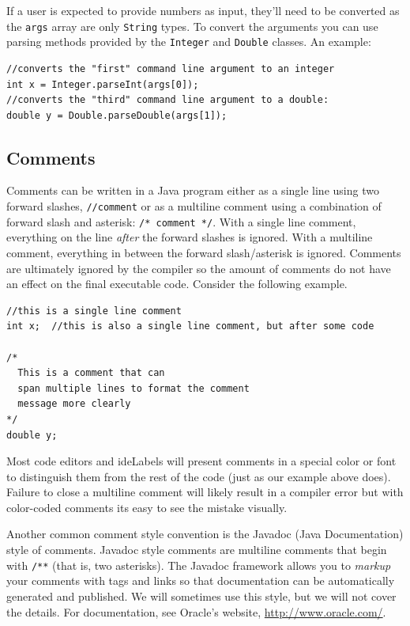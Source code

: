 If a user is expected to provide numbers as input, they'll need to
be converted as the \texttt{args} array are only \texttt{String}
types.  To convert the arguments you can use parsing methods provided by the 
\texttt{Integer} and \texttt{Double} classes.
An example:

\begin{verbatim}
//converts the "first" command line argument to an integer
int x = Integer.parseInt(args[0]);  
//converts the "third" command line argument to a double:
double y = Double.parseDouble(args[1]);
\end{verbatim}

\subsection{Comments}

Comments can be written in a Java program either as a single line using
two forward slashes, \texttt{//comment} or as a multiline comment using
a combination of forward slash and asterisk: \texttt{/* comment */}.  
With a single line comment, everything on the line \emph{after} the forward
slashes is ignored.  With a multiline comment, everything in between the forward
slash/asterisk is ignored.  Comments are ultimately ignored by the compiler so
the amount of comments do not have an effect on the final executable code.
Consider the following example.

\begin{verbatim}
//this is a single line comment
int x;  //this is also a single line comment, but after some code

/*
  This is a comment that can 
  span multiple lines to format the comment
  message more clearly
*/
double y;
\end{verbatim}

Most code editors and \glspl{ideLabel} will present comments in a special color or
font to distinguish them from the rest of the code (just as our example above does).
Failure to close a multiline comment will likely result in a compiler error but with
color-coded comments its easy to see the mistake visually.

Another common comment style convention is the Javadoc (Java Documentation)
style of comments.  Javadoc style comments are multiline comments that begin
with \texttt{/**} (that is, two asterisks).  The Javadoc framework allows you
to \emph{markup} your comments with tags and links so that documentation can
be automatically generated and published.  We will sometimes use this style, but
we will not cover the details.  For documentation, see Oracle's website, \url{http://www.oracle.com/}.

